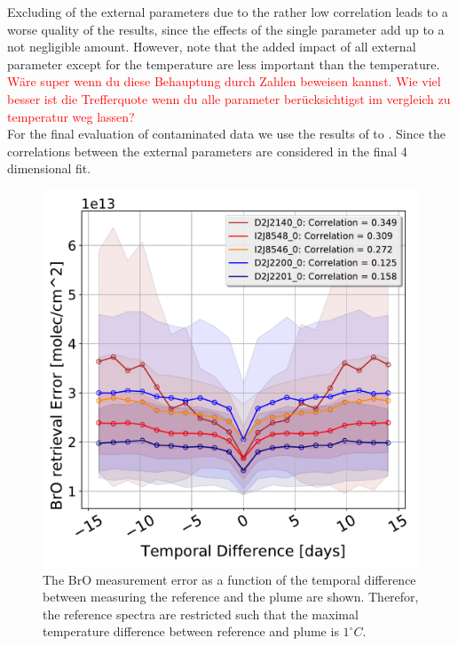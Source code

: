 \documentclass  [
  paper    = a4,
  BCOR     = 10mm,
  twoside,
  fontsize = 12pt,
  fleqn,
  toc      = bibnumbered,
  toc      = listofnumbered,
  numbers  = noendperiod,
  headings = normal,
  listof   = leveldown,
  version  = 3.03
]                                       {scrreprt}
\begin{document}
	Excluding of the external parameters due to the rather low correlation leads to a worse quality of the results, since the effects of the single parameter add up to a not negligible amount. However, note that  the added impact of all external parameter except for the temperature are less important than the temperature. \textcolor{red}{Wäre super wenn du diese Behauptung durch Zahlen beweisen kannst. Wie viel besser ist die Trefferquote wenn du alle parameter berücksichtigst im vergleich zu temperatur weg lassen?}\\
	For the final evaluation of contaminated data we use the results of  to . Since the correlations between the external parameters are considered in the final 4 dimensional fit.\\
	\begin{figure}
		\centering
		\includegraphics[width=0.7\linewidth]{Bilder/BrOErr_OhnEVar/DatwithoutOtherparamallInstruments}
		\caption{The BrO measurement error as a function of the temporal difference between measuring the reference and the plume are shown. Therefor, the reference spectra are restricted such that the maximal temperature difference between reference and plume is $1^\circ C$.}
		\label{fig:datwithoutotherparamallinstruments}
	\end{figure}
\end{document}
